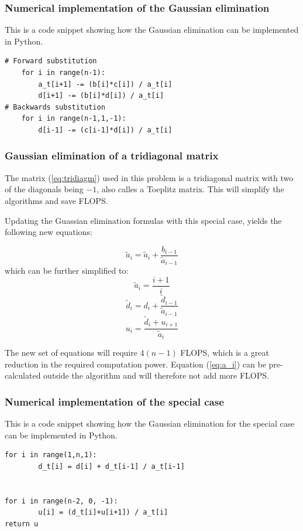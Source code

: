 \documentclass[12pt]{article}
\begin{document}
\subsubsection{Numerical implementation of the Gaussian elimination}
This is a code snippet showing how the Gaussian elimination can be implemented in Python. 
\lstset{language=Python}
\lstset{frame=lines}
\lstset{basicstyle=\footnotesize}
\begin{lstlisting}
# Forward substitution
	for i in range(n-1):  
		a_t[i+1] -= (b[i]*c[i]) / a_t[i]
		d[i+1] -= (b[i]*d[i]) / a_t[i]
# Backwards substitution
	for i in range(n-1,1,-1): 
		d[i-1] -= (c[i-1]*d[i]) / a_t[i]
\end{lstlisting}

\subsubsection{Gaussian elimination of a tridiagonal matrix}
The matrix (\ref{eq:tridiagm}) used in this problem is a tridiagonal matrix with two of the diagonals being $-1$, also calles a Toeplitz matrix. This will simplify the algorithms and save FLOPS.

Updating the Guassian elimination formulas with this special case, yields the following new equations:

\begin{equation}
\tilde{a}_{i}=\tilde{a}_{i}+\frac{b_{i-1}}{\tilde{a}_{i-1}}
\end{equation}
which can be further simplified to:
\begin{equation}
\tilde{a}_{i}=\frac{i+1}{i}
\label{eq:a_i}
\end{equation}
\begin{equation}
\tilde{d}_{i}=d_{i}+\frac{\tilde{d}_{i-1}}{\tilde{a}_{i-1}}
\end{equation}
\begin{equation}
u_{i}=\frac{\tilde{d}_{i}+u_{i+1}}{\tilde{a}_{i}}
\end{equation}

The new set of equations will require $4(n-1)$ FLOPS, which is a great reduction in the required computation power. Equation (\ref{eq:a_i}) can be pre-calculated outside the algorithm and will therefore not add more FLOPS.

\subsubsection{Numerical implementation of the special case}
This is a code snippet showing how the Gaussian elimination for the special case can be implemented in Python. 
\lstset{language=Python}
\lstset{frame=lines}
\lstset{basicstyle=\footnotesize}
\begin{lstlisting}
for i in range(1,n,1):
		d_t[i] = d[i] + d_t[i-1] / a_t[i-1]
        

for i in range(n-2, 0, -1):
		u[i] = (d_t[i]+u[i+1]) / a_t[i]
return u
\end{lstlisting}
\end{document}
